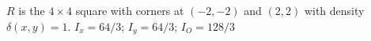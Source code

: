 {$R$ is the $4\times 4$ square with corners at $(-2,-2)$ and $(2,2)$ with density $\delta(x,y) = 1$. 
}
{$I_x = 64/3$; $I_y = 64/3$; $I_O = 128/3$
}